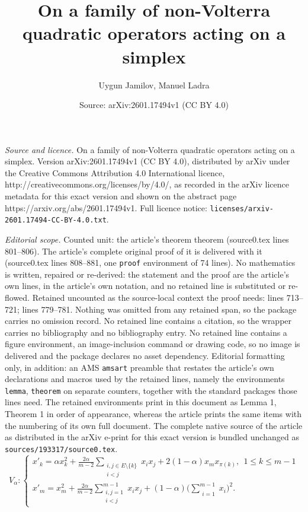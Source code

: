 \documentclass[10pt,a4paper]{amsart}
\title{On a family of non-Volterra quadratic operators acting on a simplex}
\author{Uygun Jamilov, Manuel Ladra}
\date{Source: arXiv:2601.17494v1 (CC BY 4.0)}
\begin{document}
\maketitle

\noindent\emph{Source and licence.} On a family of non-Volterra quadratic operators acting on a simplex. Version arXiv:2601.17494v1 (CC BY 4.0), distributed by arXiv under the Creative Commons Attribution 4.0 International licence, http://creativecommons.org/licenses/by/4.0/, as recorded in the arXiv licence metadata for this exact version and shown on the abstract page https://arxiv.org/abs/2601.17494v1. Full licence notice: \texttt{licenses/arxiv-2601.17494-CC-BY-4.0.txt}.\par\smallskip

\noindent\textit{Editorial scope.} Counted unit: the article's theorem theorem (source0.tex lines 801--806). The article's complete original proof of it is delivered with it (source0.tex lines 808--881, one \texttt{proof} environment of 74 lines). No mathematics is written, repaired or re-derived: the statement and the proof are the article's own lines, in the article's own notation, and no retained line is substituted or re-flowed.  Retained uncounted as the source-local context the proof needs: lines 713--721; lines 779--781.  Nothing was omitted from any retained span, so the package carries no omission record.  No retained line contains a citation, so the wrapper carries no bibliography and no bibliography entry.  No retained line contains a figure environment, an image-inclusion command or drawing code, so no image is delivered and the package declares no asset dependency.  Editorial formatting only, in addition: an AMS \texttt{amsart} preamble that restates the article's own declarations and macros used by the retained lines, namely the environments \texttt{lemma}, \texttt{theorem} on separate counters, together with the standard packages those lines need.  The retained environments print in this document as Lemma 1, Theorem 1 in order of appearance, whereas the article prints the same items with the numbering of its own full document.  The complete native source of the article as distributed in the arXiv e-print for this exact version is bundled unchanged as \texttt{sources/193317/source0.tex}.
\begin{equation}\label{opcc}
V_\alpha: \left\{\begin{array}{lll}
               x'_{k}= \alpha x_k^2 +
               \frac{2\alpha}{m-2}\displaystyle\sum_{\substack{i,j\in E\setminus\{k\}\\ i<j}} x_ix_j + 2(1-\alpha)x_m x_{\pi(k)}, \ \ 1\leq k\leq m-1\\[5mm]
               x'_{m}= x_m^2+
               \frac{2\alpha}{m-2}\displaystyle\sum_{\substack{i,j=1\\ i<j}}^{m-1} x_ix_j +
               (1-\alpha) \Big(\displaystyle\sum_{\substack{i=1}}^{m-1} x_i\Big)^2.
\end{array}\right.
\end{equation}
\end{document}
